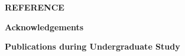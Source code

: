 \documentclass[12pt,a4paper,notitlepage,oneside]{report}
\title{\fontsize{16pt}{22pt}\selectfont\bf\ThesisTitle}
\author{}
\date{}
\begin{document}

\maketitle



\clearpage
\begin{spacing}{1.0}
\tableofcontents
\end{spacing}

\clearpage
{} %



{\def\chapter*#1{}
\clearpage
\begin{center}\fontsize{14pt}{14pt}\selectfont\bf REFERENCE\end{center}
\begin{spacing}{1.5}
\fontsize{12pt}{12pt}\selectfont
{}

\end{spacing}}

{\def\chapter*#1{}
\clearpage
\begin{center}\fontsize{14pt}{14pt}\selectfont\bf Acknowledgements\end{center}
}

{\def\chapter*#1{}
\clearpage
\begin{center}\fontsize{14pt}{14pt}\selectfont\bf Publications during Undergraduate Study\end{center}
}
\end{document}
